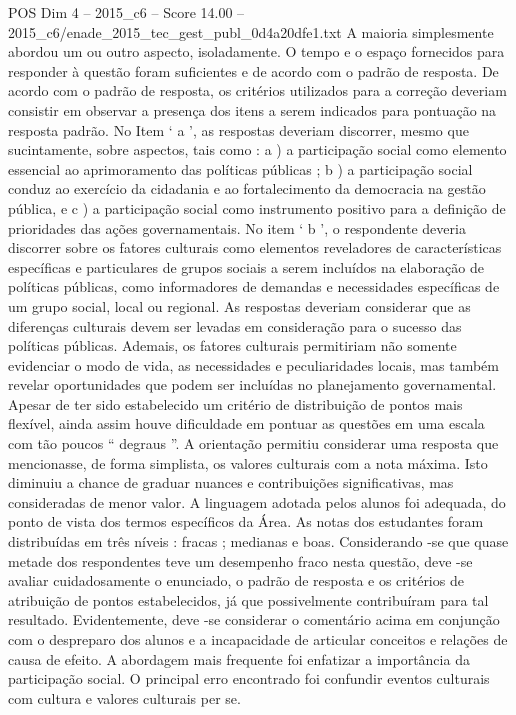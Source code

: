 \begin{textsample}{POS Dim 4 – 2015\_c6 – Score 14.00 – 2015\_c6/enade\_2015\_tec\_gest\_publ\_0d4a20dfe1.txt}
A maioria simplesmente abordou um ou outro aspecto, isoladamente.
O tempo e o espaço fornecidos para responder à questão foram suficientes e de acordo com o padrão de resposta.
De acordo com o padrão de resposta, os critérios utilizados para a correção deveriam consistir em observar a presença dos itens a serem indicados para pontuação na resposta padrão.
No Item ‘ a ’, as respostas deveriam discorrer, mesmo que sucintamente, sobre aspectos, tais como : a ) a participação social como elemento essencial ao aprimoramento das políticas públicas ; b ) a participação social conduz ao exercício da cidadania e ao fortalecimento da democracia na gestão pública, e c ) a participação social como instrumento positivo para a definição de prioridades das ações governamentais.
No item ‘ b ’, o respondente deveria discorrer sobre os fatores culturais como elementos reveladores de características específicas e particulares de grupos sociais a serem incluídos na elaboração de políticas públicas, como informadores de demandas e necessidades específicas de um grupo social, local ou regional.
As respostas deveriam considerar que as diferenças culturais devem ser levadas em consideração para o sucesso das políticas públicas.
Ademais, os fatores culturais permitiriam não somente evidenciar o modo de vida, as necessidades e peculiaridades locais, mas também revelar oportunidades que podem ser incluídas no planejamento governamental.
Apesar de ter sido estabelecido um critério de distribuição de pontos mais flexível, ainda assim houve dificuldade em pontuar as questões em uma escala com tão poucos “ degraus ”.
A orientação permitiu considerar uma resposta que mencionasse, de forma simplista, os valores culturais com a nota máxima.
Isto diminuiu a chance de graduar nuances e contribuições significativas, mas consideradas de menor valor.
A linguagem adotada pelos alunos foi adequada, do ponto de vista dos termos específicos da Área.
As notas dos estudantes foram distribuídas em três níveis : fracas ; medianas e boas.
Considerando -se que quase metade dos respondentes teve um desempenho fraco nesta questão, deve -se avaliar cuidadosamente o enunciado, o padrão de resposta e os critérios de atribuição de pontos estabelecidos, já que possivelmente contribuíram para tal resultado.
Evidentemente, deve -se considerar o comentário acima em conjunção com o despreparo dos alunos e a incapacidade de articular conceitos e relações de causa de efeito.
A abordagem mais frequente foi enfatizar a importância da participação social.
O principal erro encontrado foi confundir eventos culturais com cultura e valores culturais per se.

\end{textsample}
